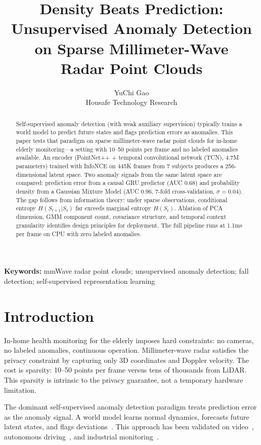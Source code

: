\documentclass[11pt,a4paper]{article}
\title{
    {\LARGE\bfseries Density Beats Prediction:\\[4pt]
    \large Unsupervised Anomaly Detection on Sparse Millimeter-Wave\\[2pt]
    Radar Point Clouds}\\[8pt]
}
\author{%
    YuChi Gao\\
    \small
    Housafe Technology Research
}
\date{}
\begin{document}
\maketitle

\begin{abstract}
Self-supervised anomaly detection (with weak auxiliary supervision) typically trains a world model to predict future states and flags prediction errors as anomalies.
This paper tests that paradigm on sparse millimeter-wave radar point clouds for in-home elderly monitoring---a setting with 10--50 points per frame and no labeled anomalies available.
An encoder (PointNet++ + temporal convolutional network (TCN), 4.7M parameters) trained with InfoNCE on 445K frames from 7 subjects produces a 256-dimensional latent space.
Two anomaly signals from the same latent space are compared: prediction error from a causal GRU predictor (AUC 0.68) and probability density from a Gaussian Mixture Model (AUC 0.96, 7-fold cross-validation, $\sigma = 0.04$).
The gap follows from information theory: under sparse observations, conditional entropy $H(S_{t+1}|S_t)$ far exceeds marginal entropy $H(S_t)$.
Ablation of PCA dimension, GMM component count, covariance structure, and temporal context granularity identifies design principles for deployment.
The full pipeline runs at 1.1ms per frame on CPU with zero labeled anomalies.
\end{abstract}

\vspace{-8pt}
\noindent\textbf{Keywords:} mmWave radar point clouds; unsupervised anomaly detection; fall detection; self-supervised representation learning

\section{Introduction}

In-home health monitoring for the elderly imposes hard constraints: no cameras, no labeled anomalies, continuous operation.
Millimeter-wave radar satisfies the privacy constraint by capturing only 3D coordinates and Doppler velocity.
The cost is sparsity: 10--50 points per frame versus tens of thousands from LiDAR.
This sparsity is intrinsic to the privacy guarantee, not a temporary hardware limitation.

The dominant self-supervised anomaly detection paradigm treats prediction error as the anomaly signal.
A world model learns normal dynamics, forecasts future latent states, and flags deviations~\cite{lecun2022path,liu2018future}.
This approach has been validated on video~\cite{liu2018future}, autonomous driving~\cite{hu2023safe}, and industrial monitoring~\cite{su2022anomaly}.
\end{document}
